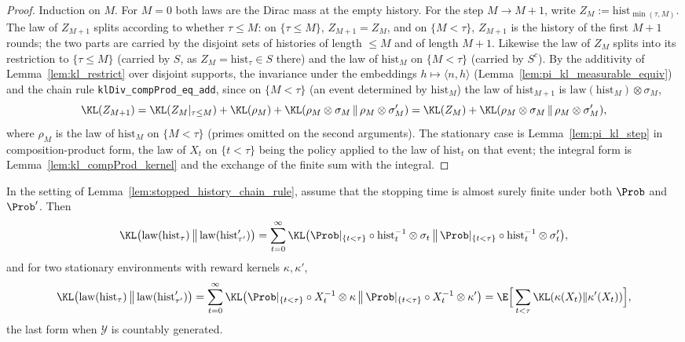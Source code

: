 \begin{proof}
\leanok
{}
Induction on $M$. For $M = 0$ both laws are the Dirac mass at the empty history. For the step
$M\to M+1$, write $Z_M := \mathrm{hist}_{\min(\tau,M)}$. The law of $Z_{M+1}$ splits according
to whether $\tau \le M$: on $\{\tau\le M\}$, $Z_{M+1} = Z_M$, and on $\{M < \tau\}$, $Z_{M+1}$ is the
history of the first $M+1$ rounds; the two parts are carried by the disjoint sets of histories of
length $\le M$ and of length $M+1$. Likewise the law of $Z_M$ splits into its restriction to
$\{\tau\le M\}$ (carried by $S$, as $Z_M = \mathrm{hist}_\tau \in S$ there) and the law of
$\mathrm{hist}_M$ on $\{M<\tau\}$ (carried by $S^c$). By the additivity of
Lemma~\ref{lem:kl_restrict} over disjoint supports, the invariance under the embeddings
$h\mapsto\langle n,h\rangle$ (Lemma~\ref{lem:pi_kl_measurable_equiv}) and the chain rule
\texttt{klDiv\_compProd\_eq\_add}, since on $\{M<\tau\}$ (an event determined by
$\mathrm{hist}_M$) the law of $\mathrm{hist}_{M+1}$ is $\mathrm{law}(\mathrm{hist}_M)\otimes\sigma_M$,
\[
  \KL(Z_{M+1}) = \KL(Z_M|_{\tau\le M}) + \KL(\rho_M) + \KL(\rho_M\otimes\sigma_M\,\|\,\rho_M\otimes\sigma'_M)
  = \KL(Z_M) + \KL(\rho_M\otimes\sigma_M\,\|\,\rho_M\otimes\sigma'_M),
\]
where $\rho_M$ is the law of $\mathrm{hist}_M$ on $\{M<\tau\}$ (primes omitted on the second
arguments). The stationary case is Lemma~\ref{lem:pi_kl_step} in composition-product form, the
law of $X_t$ on $\{t<\tau\}$ being the policy applied to the law of $\mathrm{hist}_t$ on that
event; the integral form is Lemma~\ref{lem:kl_compProd_kernel} and the exchange of the finite sum
with the integral.
\end{proof}

\begin{theorem}\label{thm:divergence_decomposition_stopping}
\leanok
{}
In the setting of Lemma~\ref{lem:stopped_history_chain_rule}, assume that the stopping time is
almost surely finite under both $\Prob$ and $\Prob'$. Then
\[
  \KL\big(\mathrm{law}(\mathrm{hist}_\tau)\,\big\|\,\mathrm{law}(\mathrm{hist}'_{\tau'})\big)
  = \sum_{t=0}^{\infty} \KL\big(\Prob|_{\{t<\tau\}}\circ\mathrm{hist}_t^{-1}\otimes\sigma_t\,\big\|\,
      \Prob|_{\{t<\tau\}}\circ\mathrm{hist}_t^{-1}\otimes\sigma'_t\big),
\]
and for two stationary environments with reward kernels $\kappa,\kappa'$,
\[
  \KL\big(\mathrm{law}(\mathrm{hist}_\tau)\,\big\|\,\mathrm{law}(\mathrm{hist}'_{\tau'})\big)
  = \sum_{t=0}^{\infty}\KL\big(\Prob|_{\{t<\tau\}}\circ X_t^{-1}\otimes\kappa\,\big\|\,\Prob|_{\{t<\tau\}}\circ X_t^{-1}\otimes\kappa'\big)
  = \E\Big[\sum_{t<\tau}\KL(\kappa(X_t)\|\kappa'(X_t))\Big],
\]
the last form when $\mathcal{Y}$ is countably generated.
\end{theorem}


